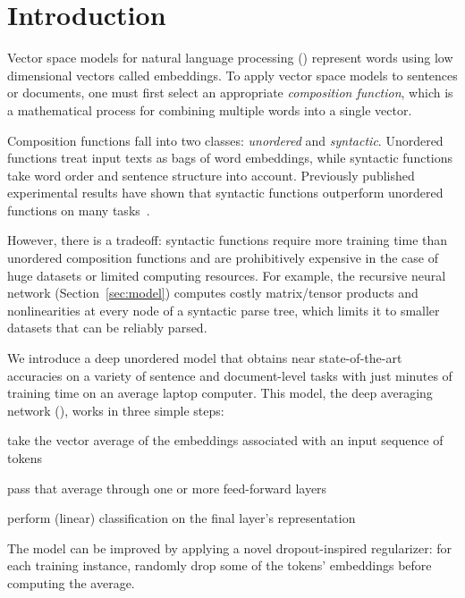 \section{Introduction}
\label{sec:introduction}

Vector space models for natural language processing () represent
words using low dimensional vectors called embeddings. To apply vector space models to sentences or documents, one must first select an appropriate \emph{composition function}, which is a mathematical process for combining multiple words into a single vector.  

Composition functions fall into two classes:
\emph{unordered} and \emph{syntactic}. Unordered functions treat input texts
as bags of word embeddings, while syntactic functions take word order and
sentence structure into account. Previously published experimental results have
shown that syntactic functions outperform unordered functions on many
tasks~\cite{socher2013recursive,nal2013conv}.

However, there is a tradeoff: syntactic functions require more training time
than unordered composition functions and are prohibitively expensive in the
case of huge datasets or limited computing resources. For example, the recursive
neural network (Section~\ref{sec:model}) computes costly matrix/tensor products
and nonlinearities at every node of a syntactic parse tree, which limits it to
smaller datasets that can be reliably parsed.

We introduce a deep unordered model that obtains near state-of-the-art
accuracies on a variety of sentence and document-level tasks with just minutes
of training time on an average laptop computer. This model, the
deep averaging network (\dan), works in three simple steps:
\begin{enumerate*}
\item take the vector average of the embeddings associated with an input sequence of tokens
\item pass that average through one or more feed-forward layers
\item perform (linear) classification on the final layer's representation
\end{enumerate*}



\noindent The model can be improved by applying a novel dropout-inspired regularizer: for
each training instance, randomly drop some of the tokens' embeddings before
computing the average. 


